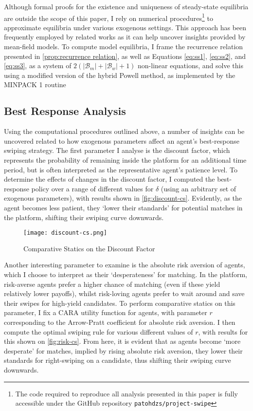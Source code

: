 Although formal proofs for the existence and uniqueness of steady-state equilibria are outside the scope of this paper, I rely on numerical procedures\footnote{The code required to reproduce all analysis presented in this paper is fully accessible under the GitHub repository \texttt{patohdzs/project-swipe}} to approximate equilibria under various exogenous settings. This approach has been frequently employed by related works \citep[see][]{iyer2014mean, gummadi2011optimal} as it can help uncover insights provided by mean-field models. To compute model equilibria, I frame the recurrence relation presented in \autoref{prop:recurrence relation}, as well as Equations \ref{eq:ss1}, \ref{eq:ss2}, and \ref{eq:ss3}, as a system of $2(|\mathcal{B}_m|+|\mathcal{B}_w|+1)$ non-linear equations, and solve this using a modified version of the hybrid Powell method, as implemented by the MINPACK 1 routine \citep{more1980user}  

\subsection{Best Response Analysis}\label{sec:section3.2} 
Using the computational procedures outlined above, a number of insights can be uncovered related to how exogenous parameters affect an agent's best-response swiping strategy. The first parameter I analyse is the discount factor, which represents the probability of remaining inside the platform for an additional time period, but is often interpreted as the representative agent's patience level. To determine the effects of changes in the discount factor, I computed the best-response policy over a range of different values for $\delta$ (using an arbitrary set of exogenous parameters), with results shown in \autoref{fig:discount-cs}. Evidently, as the agent becomes less patient, they `lower their standards' for potential matches in the platform, shifting their swiping curve downwards. 

\begin{figure}[ht] 
    \centering
    \caption{Comparative Statics on the Discount Factor}
    \texttt{[image: discount-cs.png]}
    \label{fig:discount-cs}
\end{figure} 

Another interesting parameter to examine is the absolute risk aversion of agents, which I choose to interpret as their `desperateness' for matching. In the platform, risk-averse agents prefer a higher chance of matching (even if these yield relatively lower payoffs), whilst risk-loving agents prefer to wait around and save their swipes for high-yield candidates. To perform comparative statics on this parameter, I fix a CARA utility function for agents, with parameter $r$ corresponding to the Arrow-Pratt coefficient for absolute risk aversion. I then compute the optimal swiping rule for various different values of $r$, with results for this shown on \autoref{fig:risk-cs}. From here, it is evident that as agents become `more desperate' for matches, implied by rising absolute risk aversion, they lower their standards for right-swiping on a candidate, thus shifting their swiping curve downwards.

